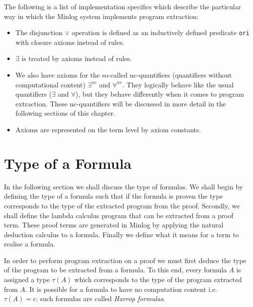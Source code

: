 \begin{myremark}
The following is a list of implementation specifics which describe the particular way in which the Minlog system implements program extraction:

\begin{itemize}
\item The disjunction $\vee$ operation is defined as an inductively defined predicate \texttt{ori} with closure axioms instead of  rules.

\item $\exists$ is treated by axioms instead of rules.

\item We also have axioms for the so-called nc-quantifiers (quantifiers without computational content) $\exists^{nc}$ and $\forall^{nc}$. They logically behave like the usual quantifiers ($\exists$ and $\forall$), but they behave differently when it comes 
to program extraction. These nc-quantifiers will be discussed in more detail in the following sections of this chapter.

\item Axioms are represented on the term level by axiom constants.

\end{itemize}

\end{myremark}

\section{Type of a Formula}

In the following section we shall discuss the type of formulas. We shall begin by defining the type of a formula such that if the formula is proven the type corresponds to the type of the extracted program from the proof. Secondly, we shall define the lambda calculus program that can be extracted from a proof term. These proof terms are generated in Minlog by applying the natural deduction calculus to a formula.  Finally we define what it means for a term to realise a formula.

In order to perform program extraction on a proof we must first deduce the
type of the program to be extracted from a formula. To this end, every formula $A$ is assigned a type $\tau(A)$ which corresponds to the type of the program extracted from $A$. It is possible for a formula to have no computation content i.e. $\tau(A) = \epsilon$; such formulas are called \emph{Harrop formulas}.


